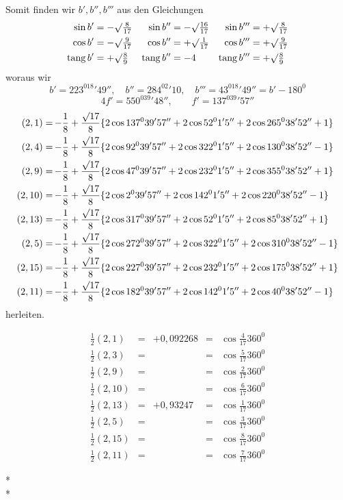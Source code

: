 Somit finden wir $b',b'',b'''$ aus den Gleichungen
\[
\begin{aligned}
\sin b'&=-\surd\tfrac8{17}&\sin b''&=-\surd\tfrac{16}{17}&\sin b'''&=+\surd\tfrac8{17}\\
\cos b'&=-\surd\tfrac9{17}&\cos b''&=+\surd\tfrac1{17}&\cos b'''&=+\surd\tfrac9{17}\\
\operatorname{tang}b'&=+\surd\tfrac89&\operatorname{tang}b''&=-4&\operatorname{tang}b'''&=+\surd\tfrac89
\end{aligned}
\]
woraus wir
\[
b'=223^018'49'',\quad b''=284^02'10,\quad b'''=43^018'49''=b'-180^0
\]
\[
4f'=550^039'48'',\qquad f'=137^039'57''
\]
\begingroup{}
\[
\!\begin{aligned}
(2,1)&=\mkern-2mu-\frac18+\frac{\surd17}8\{2\cos137^039'57''+2\cos52^01'5''+2\cos265^038'52''+1\}\\
(2,4)&=\mkern-2mu-\frac18+\frac{\surd17}8\{2\cos92^039'57''+2\cos322^01'5''+2\cos130^038'52''-1\}\\
(2,9)&=\mkern-2mu-\frac18+\frac{\surd17}8\{2\cos47^039'57''+2\cos232^01'5''+2\cos355^038'52''+1\}\\
(2,10)&=\mkern-2mu-\frac18+\frac{\surd17}8\{2\cos2^039'57''+2\cos142^01'5''+2\cos220^038'52''-1\}\\
(2,13)&=\mkern-2mu-\frac18+\frac{\surd17}8\{2\cos317^039'57''+2\cos52^01'5''+2\cos85^038'52''+1\}\\
(2,5)&=\mkern-2mu-\frac18+\frac{\surd17}8\{2\cos272^039'57''+2\cos322^01'5''+2\cos310^038'52''-1\}\\
(2,15)&=\mkern-2mu-\frac18+\frac{\surd17}8\{2\cos227^039'57''+2\cos232^01'5''+2\cos175^038'52''+1\}\\
(2,11)&=\mkern-2mu-\frac18+\frac{\surd17}8\{2\cos182^039'57''+2\cos142^01'5''+2\cos40^038'52''-1\}
\end{aligned}
\]
herleiten.
\endgroup

\[
\begin{array}{rclcl}
\frac12(2,1)&=&+0{,}092268&=&\cos\frac4{17}360^0\\[3pt]
\frac12(2,3)&=&&=&\cos\frac5{17}360^0\\[3pt]
\frac12(2,9)&=&&=&\cos\frac2{17}360^0\\[3pt]
\frac12(2,10)&=&&=&\cos\frac6{17}360^0\\[3pt]
\frac12(2,13)&=&+0{,}93247&=&\cos\frac1{17}360^0\\[3pt]
\frac12(2,5)&=&&=&\cos\frac3{17}360^0\\[3pt]
\frac12(2,15)&=&&=&\cos\frac8{17}360^0\\[3pt]
\frac12(2,11)&=&&=&\cos\frac7{17}360^0
\end{array}
\]
\endgroup
\begin{center}*\qquad\qquad*\\*\end{center}

